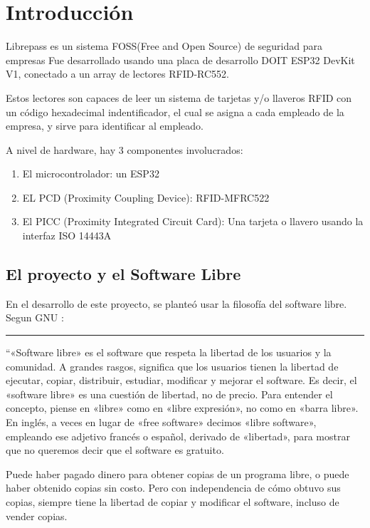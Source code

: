 \documentclass[../informe_krapp.tex]{subfiles}
\begin{document}
\graphicspath{{../images/}}
\section{Introducción}
Librepass es un sistema FOSS(Free and Open Source) de seguridad para empresas
Fue desarrollado usando una placa de desarrollo DOIT ESP32 DevKit V1, conectado
a un array de lectores RFID-RC552.

Estos lectores son capaces de leer un sistema de tarjetas y/o llaveros RFID con un
código hexadecimal indentificador, el cual se asigna a cada empleado de la empresa, y
sirve para identificar al empleado.

A nivel de hardware, hay 3 componentes involucrados:
\begin{enumerate}
	\item El microcontrolador: un ESP32
	\item EL PCD (Proximity Coupling Device): RFID-MFRC522
	\item El PICC (Proximity Integrated Circuit Card): Una tarjeta o llavero usando
	      la interfaz ISO 14443A
\end{enumerate}

\subsection{El proyecto y el Software Libre}
En el desarrollo de este proyecto, se planteó usar la filosofía del software libre.
Segun GNU \cite{gnu}:
\begin{center}
	\rule{0.8\textwidth}{0.3pt}
\end{center}
``«Software libre» es el software que respeta la libertad de los usuarios y la comunidad. A grandes rasgos, significa que los usuarios tienen la libertad de ejecutar, copiar, distribuir, estudiar, modificar y mejorar el software. Es decir, el «software libre» es una cuestión de libertad, no de precio. Para entender el concepto, piense en «libre» como en «libre expresión», no como en «barra libre». En inglés, a veces en lugar de «free software» decimos «libre software», empleando ese adjetivo francés o español, derivado de «libertad», para mostrar que no queremos decir que el software es gratuito.

Puede haber pagado dinero para obtener copias de un programa libre, o puede haber obtenido copias sin costo. Pero con independencia de cómo obtuvo sus copias, siempre tiene la libertad de copiar y modificar el software, incluso de vender copias.
\end{document}
